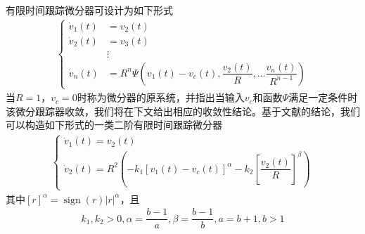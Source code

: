 有限时间跟踪微分器可设计为如下形式\cite{Guo_2011b}
\begin{align}\left\{\begin{aligned}
\dot{v}_{1}(t) &=v_{2}(t) \\
\dot{v}_{2}(t) &=v_{3}(t) \\
& \vdots \\
\dot{v}_{n}(t) &=R^{n} \Psi \left(v_{1}(t)-v_c(t), \dfrac{v_{2}(t)}{R}, \ldots \dfrac{v_{n}(t)}{R^{n-1}}\right)	
\end{aligned}\right.	\label{eq_h_TD}
\end{align}
当$ R=1$，$v_c=0 $时称为微分器的原系统，并指出当输入$v_c$和函数$\Psi$满足一定条件时该微分跟踪器收敛，我们将在下文给出相应的收敛性结论。基于文献\parencite{Guo_2011b}的结论，我们可以构造如下形式的一类二阶有限时间跟踪微分器
\begin{align}
\left\{\begin{array}{l}
\dot{v}_{1}(t)=v_{2}(t) \\
\dot{v}_{2}(t)=R^{2}\left(-k_{1}\left[v_{1}(t)-v_c(t)\right]^{\alpha}-k_{2}\left[\dfrac{v_{2}(t)}{R}\right]^{\beta}\right)
\end{array}\right.	\label{eq_sec_TD}
\end{align}
其中$ [r]^{\alpha}=\operatorname{sign}(r)\left|r\right|^{\alpha} $，且
\begin{align}
k_{1}, k_{2}>0, \alpha=\dfrac{b-1}{a}, \beta=\dfrac{b-1}{b}, a=b+1, b>1	\label{eq_para_sec_TD}
\end{align}
